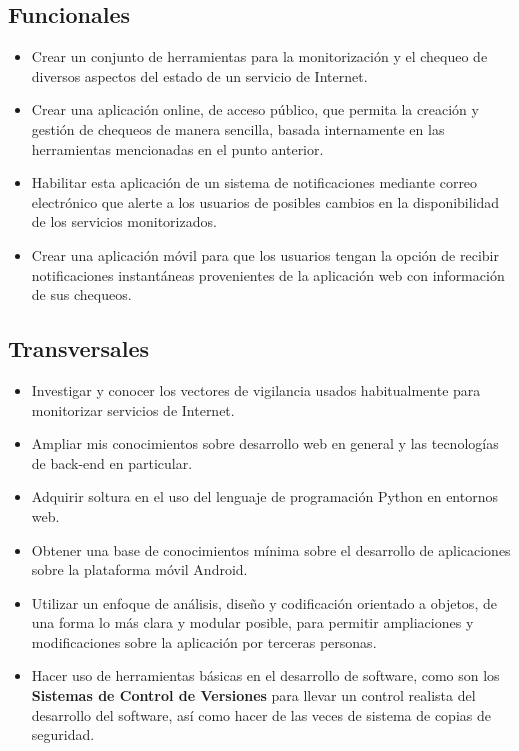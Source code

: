 \subsection{Funcionales}
\begin{itemize}
\item Crear un conjunto de herramientas para la monitorización y el chequeo de
  diversos aspectos del estado de un servicio de Internet.
\item Crear una aplicación online, de acceso público, que permita la creación y
  gestión de chequeos de manera sencilla, basada internamente en las
  herramientas mencionadas en el punto anterior.
\item Habilitar esta aplicación de un sistema de notificaciones mediante correo
  electrónico que alerte a los usuarios de posibles cambios en la disponibilidad
  de los servicios monitorizados.
\item Crear una aplicación móvil para que los usuarios tengan la opción de
  recibir notificaciones instantáneas provenientes de la aplicación web con
  información de sus chequeos.
\end{itemize}

\subsection{Transversales}
\begin{itemize}
\item Investigar y conocer los vectores de vigilancia usados habitualmente para
  monitorizar servicios de Internet.
\item Ampliar mis conocimientos sobre desarrollo web en general y las
  tecnologías de back-end en particular.
\item Adquirir soltura en el uso del lenguaje de programación Python en entornos
  web.
\item Obtener una base de conocimientos mínima sobre el desarrollo de
  aplicaciones sobre la plataforma móvil Android.
\item Utilizar un enfoque de análisis, diseño y codificación orientado
  a objetos, de una forma lo más clara y modular posible, para
  permitir ampliaciones y modificaciones sobre la aplicación por
  terceras personas.
\item Hacer uso de herramientas básicas en el desarrollo de software,
  como son los \textbf{Sistemas de Control de Versiones} para llevar
  un control realista del desarrollo del software, así como hacer de
  las veces de sistema de copias de seguridad.
\end{itemize}

